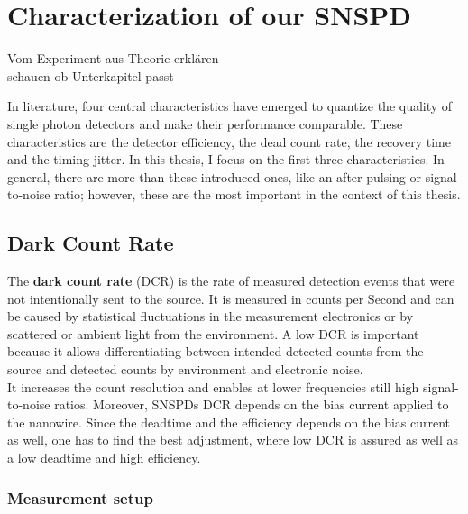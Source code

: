
\graphicspath{{/Users/maxim.re/Studium/Physik B.Sc./Semester_8_SS24/Proseminar/Figs Single Photon Detection/}}

\chapter{Characterization of our SNSPD}
\label{sec:SNSPD_Characterization}
Vom Experiment aus Theorie erklären \\ schauen ob Unterkapitel passt


In literature, four central characteristics have emerged to quantize the quality of single photon detectors and
make their performance comparable.
These characteristics are the detector efficiency, the dead count rate, the recovery time and the timing jitter.
In this thesis, I focus on the first three characteristics.
In general, there are more than these introduced ones,
like an after-pulsing or signal-to-noise ratio; however, these are the most important in the context of this thesis.

\section{Dark Count Rate}
The \textbf{dark count rate} (DCR) is the rate of measured detection events that were not intentionally sent to the source.
It is measured in counts per Second and can be caused by statistical fluctuations in the measurement electronics
or by scattered or ambient light from the environment.
A low DCR is important because it allows differentiating between intended detected counts from the source and detected counts by
environment and electronic noise. \\
It increases the count resolution and enables at lower frequencies still high signal-to-noise ratios.
Moreover, SNSPDs DCR depends on the bias current applied to the nanowire.
Since the deadtime and the efficiency depends on the bias current as well, one has to find the best adjustment,
where low DCR is assured as well as a low deadtime and high efficiency.


\subsection*{Measurement setup}

